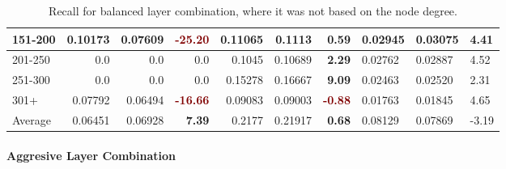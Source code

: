 \begin{table}[]
\begin{tabular}{|l|r|r|r||r|r|r||l|l|l|}
        151-200   & 0.10173                                 & 0.07609                       & \textbf{\textcolor{Maroon}{-25.20}}    & 0.11065                    & 0.1113                   & \textbf{\textcolor{OliveGreen}{0.59}} & 0.02945 & 0.03075     & 4.41  \\ \hline
        201-250   & 0.0                                     & 0.0                           & 0.0                                    & 0.1045                     & 0.10689                  & \textbf{\textcolor{OliveGreen}{2.29}} & 0.02762 & 0.02887     & 4.52  \\ \hline
        251-300   & 0.0                                     & 0.0                           & 0.0                                    & 0.15278                    & 0.16667                  & \textbf{\textcolor{OliveGreen}{9.09}} & 0.02463 & 0.02520     & 2.31  \\ \hline
        301+      & 0.07792                                 & 0.06494                       & \textbf{\textcolor{Maroon}{-16.66}}    & 0.09083                    & 0.09003                  & \textbf{\textcolor{Maroon}{-0.88}}    & 0.01763 & 0.01845     & 4.65  \\ \hline
        Average   & 0.06451                                 & 0.06928                       & \textbf{\textcolor{OliveGreen}{7.39}}  & 0.2177                     & 0.21917                  & \textbf{\textcolor{OliveGreen}{0.68}} & 0.08129 & 0.07869     & -3.19 \\ \hline
    \end{tabular}
    \caption{Recall for balanced layer combination, where it was not based on the node degree.}
    \label{tab:balanced-layer-combination-recall}
\end{table}

\paragraph{Aggresive Layer Combination}